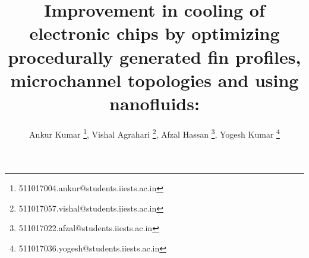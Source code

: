 \documentclass[
	fontsize=12pt, %
	twoside=false, %
	numbers=noenddot, %
]{kaohandt}
\begin{document}
\title{
	Improvement in cooling of electronic chips
	by optimizing procedurally generated fin profiles, microchannel topologies and using nanofluids: \\
}
\author[ank]{
	Ankur Kumar \footnote{511017004.ankur@students.iiests.ac.in},
	Vishal Agrahari \footnote{511017057.vishal@students.iiests.ac.in},
	Afzal Hassan \footnote{511017022.afzal@students.iiests.ac.in},
	Yogesh Kumar \footnote{511017036.yogesh@students.iiests.ac.in}
}

\maketitle



% 



\end{document}
